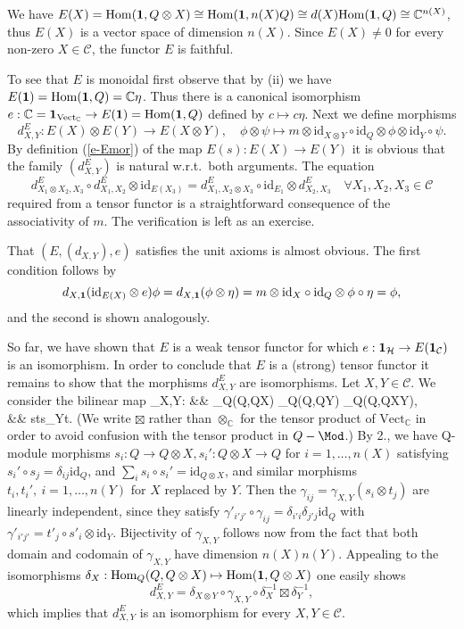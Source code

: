 \documentclass[12pt]{article}
\theoremstyle{definition}
\theoremstyle{definition}
\theoremstyle{remark}
\newcommand{\Vect}{\mathrm{Vect}}
\def\2#1{{\mathcal #1}}
\def\7#1{{\mathbb #1}}
\def\1#1{{\bf #1}}
\newcommand{\Hom}{\mathrm{Hom}}
\newcommand{\mcirc}{\circ}
\newcommand{\rarr}{\rightarrow}
\def\id{\mathrm{id}}
\newcounter{bean}
\begin{document}
\prf We have $E(X) = \Hom(\11,Q\otimes X)\cong\Hom(\11,n(X)Q)\cong d(X)\Hom(\11,Q)\cong \7C^{n(X)}$,
thus $E(X)$ is a vector space of dimension $n(X)$. Since $E(X)\ne 0$ for every non-zero
$X\in\2C$, the functor $E$ is faithful. 

To see that $E$ is monoidal first observe that by (ii) we have
$E(\11)=\Hom(\11,Q)=\7C\eta$. Thus there is a canonical isomorphism
$e: \7C=\11_{\Vect_\7C} \rarr E(\11 )=\Hom(\11,Q)$ defined by
$c\mapsto c\eta$. Next we define morphisms
\[ d^E_{X,Y}: E(X)\otimes E(Y)\rarr E(X\otimes Y), \quad \phi\otimes \psi\mapsto
   m\otimes\id_{X\otimes Y}\mcirc\id_Q\otimes\phi\otimes\id_Y\mcirc\psi. \]
By definition (\ref{e-Emor}) of the map $E(s): E(X)\rarr E(Y)$ it is obvious that the family
$(d^E_{X,Y})$ is natural w.r.t.\ both arguments. The equation
\[ d^E_{X_1\otimes X_2,X_3}\mcirc  d^E_{X_1,X_2}\otimes\id_{E(X_3)}=
   d^E_{X_1, X_2\otimes X_3}\mcirc \id_{E_1}\otimes d^E_{X_2,X_3}  \quad\forall X_1,X_2,X_3\in\2C
\]  
required from a tensor functor is a straightforward consequence of the associativity of $m$. The
verification is left as an exercise.

That $(E, (d_{X,Y}),e)$ satisfies the unit axioms is almost obvious. The first condition follows by 
\[ d_{X,\11}(\id_{E(X)}\otimes
e)\phi=d_{X,\11}(\phi\otimes\eta)=m\otimes\id_X\mcirc\id_Q\otimes\phi\mcirc\eta=\phi,
\] and the second is shown analogously.

So far, we have shown that $E$ is a weak tensor functor for which $e:
\11_\2H\rarr E(\11_\2C)$ is an isomorphism. In order to conclude that
$E$ is a (strong) tensor functor it remains to show that the morphisms
$d^E_{X,Y}$ are isomorphisms. Let $X,Y\in\2C$. We consider the
bilinear map \bean \gamma_{X,Y}: && \Hom_Q(Q,Q\otimes X)\boxtimes
\Hom_Q(Q,Q\otimes Y)\rarr
\Hom_Q(Q,Q\otimes X\otimes Y), \\
&& s\boxtimes t\mapsto s\otimes\id_Y\mcirc t.  \eean (We write
$\boxtimes$ rather than $\otimes_\7C$ for the tensor product of
$\Vect_\7C$ in order to avoid confusion with the tensor product in
$Q-\Mod$.) By 2., we have Q-module morphisms $s_i: Q\rarr Q\otimes X,
s_i': Q\otimes X\rarr Q$ for $i=1,\ldots,n(X)$ satisfying $s_i'\circ
s_j=\delta_{ij}\id_Q$, and $\sum_i s_i\circ s_i'=\id_{Q\otimes X}$,
and similar morphisms $t_i, t_i', \ i=1,\ldots,n(Y)$ for $X$ replaced
by $Y$. Then the $\gamma_{ij}=\gamma_{X,Y}(s_i\otimes t_j)$ are
linearly independent, since they satisfy
$\gamma'_{i'j'}\circ\gamma_{ij}=\delta_{i'i}\delta_{j'j}\id_Q$ with
$\gamma'_{i'j'}=t'_j \mcirc s'_i\otimes\id_Y$. Bijectivity of
$\gamma_{X,Y}$ follows now from the fact that both domain and codomain
of $\gamma_{X,Y}$ have dimension $n(X)n(Y)$.  Appealing to the
isomorphisms $\delta_X: \Hom_Q(Q,Q\otimes X)\mapsto\Hom(\11,Q\otimes
X)$ one easily shows
\[ d^E_{X,Y}= \delta_{X\otimes Y}\mcirc \gamma_{X,Y} \mcirc \delta_X^{-1} \boxtimes \delta_Y^{-1}, \]
which implies that $d^E_{X,Y}$ is an isomorphism for every $X,Y\in\2C$.
\end{document}
